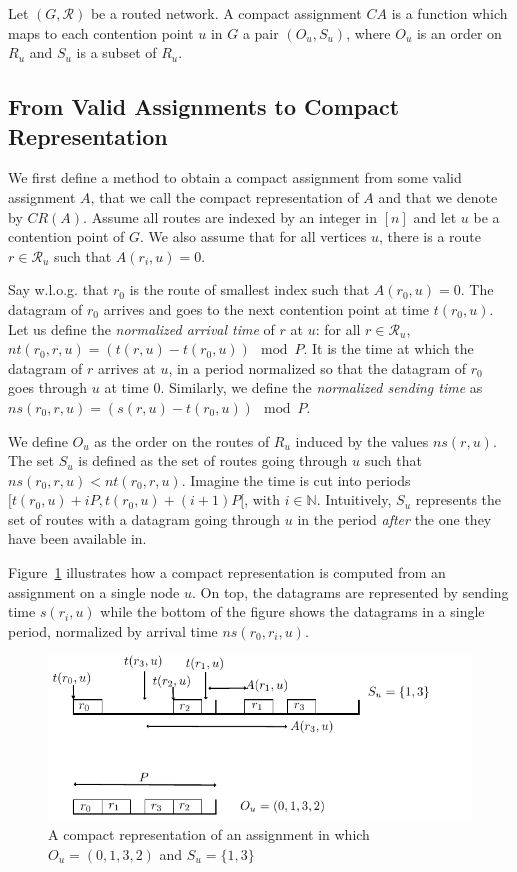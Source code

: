 \documentclass[english]{article}
\begin{document}
\begin{definition}
Let $(G, \mathcal{R})$ be a routed network. A compact assignment $CA$ is a function which maps to each contention point $u$ in $G$ a pair $(O_u,S_u)$, where $O_u$ is an order on $R_u$ and $S_u$ is a subset of $R_u$.
\label{definition:compact}
\end{definition}


\subsection{From Valid Assignments to Compact Representation}

We first define a method to obtain a compact assignment from some valid assignment $A$, that we call the compact representation of $A$ and that we denote by $CR(A)$. Assume all routes are indexed by an integer in $[n]$ and let $u$ be a contention point of $G$. We also assume that for all vertices $u$, there is a route $r \in \mathcal{R}_u$ such that $A(r_i,u) = 0$.

Say w.l.o.g. that $r_0$ is the route of smallest index such that $A(r_0,u) = 0$. The datagram of $r_0$ arrives and goes to the next contention point at time $t(r_0,u)$. Let us define the \emph{normalized arrival time} of $r$ at $u$: for all $r \in \mathcal{R}_u$, $nt(r_0,r,u) = (t(r,u) - t(r_0,u)) \mod P$. It is the time at which the datagram of $r$ arrives at $u$, in a period normalized so that the datagram of $r_0$ goes through $u$ at time $0$. Similarly, we define the \emph{normalized sending time} as $ns(r_0,r,u) = (s(r,u) - t(r_0,u)) \mod P$.

We define $O_u$ as the order on the routes of $R_u$ induced by the values $ns(r,u)$. The set $S_u$ is defined as the set of routes going through $u$ such that $ns(r_0,r,u) < nt(r_0,r,u)$. Imagine the time is cut into periods $[t(r_0,u) + iP,t(r_0,u) + (i+1)P [$, with $i \in \mathbb{N}$. Intuitively, $S_u$ represents the set of routes with a datagram going through $u$ in the period \emph{after} the one they have been available in. 

Figure~\ref{fig:normalizedassignment} illustrates how a compact representation is computed from an assignment on a single node $u$. On top, the datagrams are represented by sending time $s(r_i,u)$ while the bottom of the figure shows the datagrams in a single period, normalized by arrival time $ns(r_0,r_i,u)$.  
\begin{figure}[!h]
	\centering
	\includegraphics[scale=1]{normalizedassignment}
\caption{A compact representation of an assignment in which $O_u = (0,1,3,2)$ and $S_u = \{1,3\}$ }
\label{fig:normalizedassignment}
\end{figure}
\end{document}
